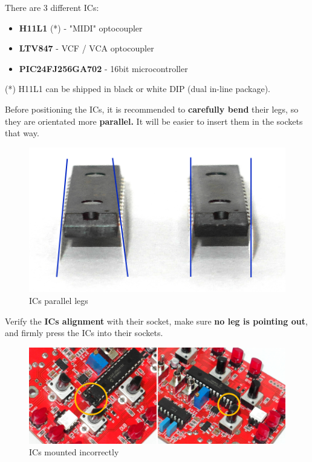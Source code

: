 \documentclass{scrartcl}
\begin{document}
There are 3 different ICs:
\begin{itemize}
    \item \textbf{H11L1} (*) - "MIDI" optocoupler
    \item \textbf{LTV847} - VCF / VCA optocoupler
    \item \textbf{PIC24FJ256GA702} - 16bit microcontroller
\end{itemize}

(*) H11L1 can be shipped in black or white DIP (dual in-line package).

Before positioning the ICs, it is recommended to \textbf{carefully bend} their legs, so they are orientated more \textbf{parallel.} It will be easier to insert them in the sockets that way.

\vspace{0.25cm}
\begin{figure}[!ht]
    \begin{center}
        \includegraphics[scale=0.20]{assets/ic-bending.jpg}
        \caption{ICs parallel legs}
    \end{center}
\end{figure}

Verify the \textbf{ICs alignment} with their socket, make sure \textbf{no leg is pointing out}, and firmly press the ICs into their sockets.
\vspace{0.25cm}
\begin{figure}[!ht]
    \begin{center}
        \includegraphics[scale=0.28]{assets/ic-incorrect.jpg}
        \caption{ICs mounted incorrectly}
    \end{center}
\end{figure}
\end{document}
